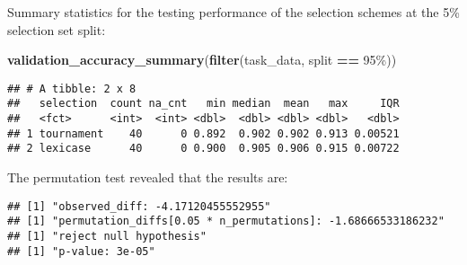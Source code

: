 \documentclass[
]{book}
\newenvironment{Shaded}{\begin{snugshade}}{\end{snugshade}}
\newcommand{\AttributeTok}[1]{\textcolor[rgb]{0.13,0.29,0.53}{#1}}
\newcommand{\DecValTok}[1]{\textcolor[rgb]{0.00,0.00,0.81}{#1}}
\newcommand{\FunctionTok}[1]{\textcolor[rgb]{0.13,0.29,0.53}{\textbf{#1}}}
\newcommand{\NormalTok}[1]{#1}
\newcommand{\OtherTok}[1]{\textcolor[rgb]{0.56,0.35,0.01}{#1}}
\newcommand{\SpecialCharTok}[1]{\textcolor[rgb]{0.81,0.36,0.00}{\textbf{#1}}}
\newcommand{\StringTok}[1]{\textcolor[rgb]{0.31,0.60,0.02}{#1}}
\begin{document}
Summary statistics for the testing performance of the selection schemes at the 5\% selection set split:

\begin{Shaded}
\begin{Highlighting}[]
\FunctionTok{validation\_accuracy\_summary}\NormalTok{(}\FunctionTok{filter}\NormalTok{(task\_data, split }\SpecialCharTok{==} \StringTok{\textquotesingle{}95\%\textquotesingle{}}\NormalTok{))}
\end{Highlighting}
\end{Shaded}

\begin{verbatim}
## # A tibble: 2 x 8
##   selection  count na_cnt   min median  mean   max     IQR
##   <fct>      <int>  <int> <dbl>  <dbl> <dbl> <dbl>   <dbl>
## 1 tournament    40      0 0.892  0.902 0.902 0.913 0.00521
## 2 lexicase      40      0 0.900  0.905 0.906 0.915 0.00722
\end{verbatim}

The permutation test revealed that the results are:

\begin{Shaded}
\end{Shaded}

\begin{verbatim}
## [1] "observed_diff: -4.17120455552955"
## [1] "permutation_diffs[0.05 * n_permutations]: -1.68666533186232"
## [1] "reject null hypothesis"
## [1] "p-value: 3e-05"
\end{verbatim}
\end{document}
